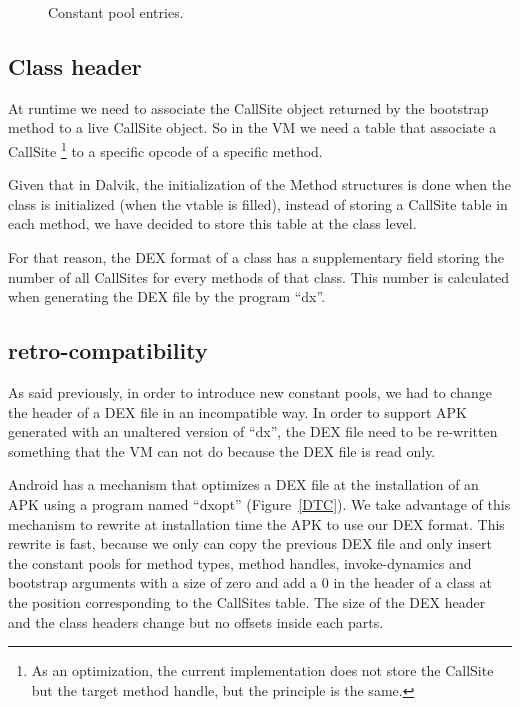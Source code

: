 \documentclass{sig-alternate}
\def \DALVIK{Dalvik\xspace}
\def \ANDROID{Android\xspace}
\begin{document}
    \begin{figure}[!ht]
      \centering 
      \centering 
      \centering 
      \centering \vspace{-1.5em}
      \caption{Constant pool entries.}
      \label{CPentries}
    \end{figure}

  \subsection{Class header}

    At runtime we need to associate the CallSite object returned by the bootstrap method
    to a live CallSite object. So in the VM we need a table that associate a CallSite
    \footnote{As an optimization, the current implementation does not store the CallSite
     but the target method handle, but the principle is the same.}
    to a specific opcode of a specific method.

    Given that in \DALVIK, the initialization of the Method structures is done when
    the class is initialized (when the vtable is filled), instead of storing a CallSite
    table in each method, we have decided to store this table at the class level.
    
    For that reason, the DEX format of a class has a supplementary field storing
    the number of all CallSites for every methods of that class. 
    This number is calculated when generating the DEX file by the program ``dx''.

  \subsection{retro-compatibility}
    \label{retro}

    As said previously, in order to introduce new constant pools, we had to change
    the header of a DEX file in an incompatible way.
    In order to support APK generated with an unaltered version of ``dx'',
    the DEX file need to be re-written something that the VM can not do
    because the DEX file is read only.

    \ANDROID has a mechanism that optimizes a DEX file at the installation of
    an APK using a program named ``dxopt'' (Figure~\ref{DTC}).
    We take advantage of this mechanism to rewrite at installation time the APK to use our DEX format.
    This rewrite is fast, because we only can copy the previous DEX file and only insert the
    constant pools for method types, method handles, invoke-dynamics and
    bootstrap arguments with a size of zero and add a 0 in the header of a class at the
    position corresponding to the CallSites table.
    The size of the DEX header and the class headers change but no offsets inside each parts.
\end{document}
